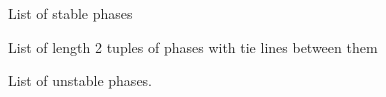 \documentclass[letterpaper,10pt,english]{sphinxmanual}
\begin{document}
\begin{fulllineitems}
\begin{fulllineitems}
\end{fulllineitems}


\begin{fulllineitems}
\label{models:qmpy.PhaseSpace.stable}
List of stable phases

\end{fulllineitems}


\begin{fulllineitems}
\label{models:qmpy.PhaseSpace.tie_lines}
List of length 2 tuples of phases with tie lines between them

\end{fulllineitems}


\begin{fulllineitems}
\label{models:qmpy.PhaseSpace.unstable}
List of unstable phases.

\end{fulllineitems}


\end{fulllineitems}

\end{document}
